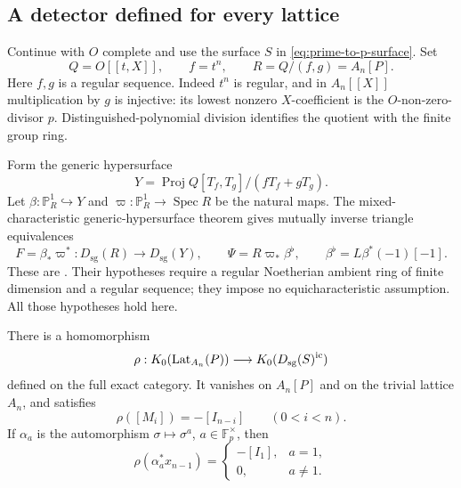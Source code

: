 \subsection{A detector defined for every lattice}

Continue with \(O\) complete and use the surface \(S\) in
\eqref{eq:prime-to-p-surface}.  Set
\[
 Q=O[[t,X]],\qquad f=t^n,\qquad
 R=Q/(f,g)=A_n[P].
\]
Here \(f,g\) is a regular sequence.  Indeed \(t^n\) is regular,
and in \(A_n[[X]]\) multiplication by \(g\) is injective: its lowest
nonzero \(X\)-coefficient is the \(O\)-non-zero-divisor \(p\).
Distinguished-polynomial division identifies the quotient with
the finite group ring.

Form the generic hypersurface
\[
 Y=\operatorname{Proj}Q[T_f,T_g]/(fT_f+gT_g).
\]
Let \(\beta:\mathbb P^1_R\hookrightarrow Y\) and
\(\varpi:\mathbb P^1_R\to\operatorname{Spec}R\) be the natural maps.
The mixed-characteristic generic-hypersurface theorem gives mutually
inverse triangle equivalences
\begin{equation}\label{eq:prime-to-p-generic-equivalence}
 F=\beta_*\varpi^*:D_{\mathrm{sg}}(R)\longrightarrow D_{\mathrm{sg}}(Y),
 \qquad
 \Psi=R\varpi_*\beta^\flat,\qquad
 \beta^\flat=L\beta^*(-1)[-1].
\end{equation}
These are \citet[Theorem 2.10, p.~8; the paragraph after Corollary 2.11,
p.~9; and the formula preceding (4.3), p.~19]{BurkeWalker2012}.
Their hypotheses require a regular Noetherian ambient ring of finite
dimension and a regular sequence; they impose no equicharacteristic
assumption.  All those hypotheses hold here.

\begin{lemma}\label{lem:prime-to-p-detector}
There is a homomorphism
\[
 \rho:K_0(\operatorname{Lat}_{A_n}(P))
                  \longrightarrow K_0(D_{\mathrm{sg}}(S)^{\mathrm{ic}})
\]
defined on the full exact category.  It vanishes on \(A_n[P]\)
and on the trivial lattice \(A_n\), and satisfies
\begin{equation}\label{eq:prime-to-p-values}
 \rho([M_i])=-[I_{n-i}]\qquad(0<i<n).
\end{equation}
If \(\alpha_a\) is the automorphism \(\sigma\mapsto\sigma^a\),
\(a\in\mathbb F_p^\times\), then
\begin{equation}\label{eq:prime-to-p-normalizer-values}
 \rho(\alpha_a^*x_{n-1})=
 \begin{cases}
 -[I_1],&a=1,\\
 0,&a\ne1.
 \end{cases}
\end{equation}
\end{lemma}

